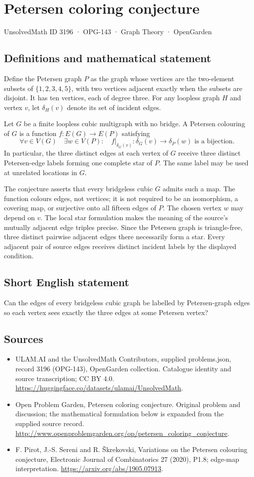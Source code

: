 \documentclass[11pt,a4paper]{article}
\begin{document}
\section*{Petersen coloring conjecture}\label{3196}
{\small UnsolvedMath ID 3196 · OPG-143 · Graph Theory · OpenGarden}
\subsection{Definitions and mathematical statement}
Define the Petersen graph $P$ as the graph whose
vertices are the two-element subsets of
$\{1,2,3,4,5\}$, with two vertices adjacent
exactly when the subsets are disjoint. It has
ten vertices, each of degree three. For any
loopless graph $H$ and vertex $v$, let
$\delta_H(v)$ denote its set of incident edges.

Let $G$ be a finite loopless cubic multigraph
with no bridge. A Petersen colouring of $G$
is a function $f:E(G)\to E(P)$ satisfying
\[
 \forall v\in V(G)\quad\exists w\in V(P):
 \quad f\big|_{\delta_G(v)}:
 \delta_G(v)\longrightarrow\delta_P(w)
 \text{ is a bijection}.
\]
In particular, the three distinct edges at
each vertex of $G$ receive three distinct
Petersen-edge labels forming one complete
star of $P$. The same label may be used at
unrelated locations in $G$.

The conjecture asserts that every bridgeless
cubic $G$ admits such a map. The function
colours edges, not vertices; it is not required
to be an isomorphism, a covering map, or
surjective onto all fifteen edges of $P$.
The chosen vertex $w$ may depend on $v$.
The local star formulation makes the meaning
of the source's mutually adjacent edge triples
precise. Since the Petersen graph is triangle-free,
three distinct pairwise adjacent edges there
necessarily form a star. Every adjacent pair
of source edges receives distinct incident
labels by the displayed condition.
\subsection{Short English statement}
Can the edges of every bridgeless cubic graph be labelled by Petersen-graph edges so each vertex sees exactly the three edges at some Petersen vertex?
\subsection{Sources}
\begin{itemize}
\item[S1] ULAM.AI and the UnsolvedMath Contributors, supplied problems.json, record 3196 (OPG-143), OpenGarden collection. Catalogue identity and source transcription; CC BY 4.0.
\url{https://huggingface.co/datasets/ulamai/UnsolvedMath}.
\item[S2] Open Problem Garden, Petersen coloring conjecture. Original problem and discussion; the mathematical formulation below is expanded from the supplied source record.
\url{http://www.openproblemgarden.org/op/petersen_coloring_conjecture}.
\item[S3] F. Pirot, J.-S. Sereni and R. Škrekovski, Variations on the Petersen colouring conjecture, Electronic Journal of Combinatorics 27 (2020), P1.8; edge-map interpretation.
\url{https://arxiv.org/abs/1905.07913}.
\end{itemize}
\end{document}

